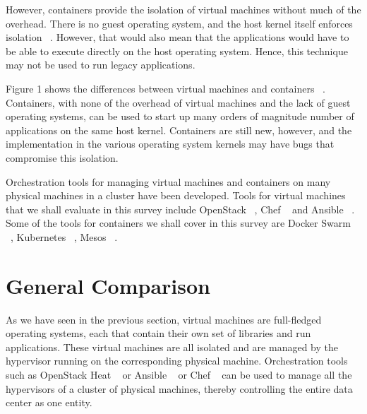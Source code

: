 \documentclass[10pt,twocolumn]{article}
\begin{document}
However, containers provide the isolation of virtual machines without much of the overhead. There is no guest operating system, and the host kernel itself enforces isolation ~\cite{intro_containerisation}.
However, that would also mean that the applications would have to be able to execute directly on the host operating system.
Hence, this technique may not be used to run legacy applications.

Figure 1 shows the differences between virtual machines and containers ~\cite{intro_containerisation}.
Containers, with none of the overhead of virtual machines and the lack of guest operating systems, can be used to start up many orders of magnitude number of applications on the same host kernel.
Containers are still new, however, and the implementation in the various operating system kernels may have bugs that compromise this isolation.

Orchestration tools for managing virtual machines and containers on many physical machines in a cluster have been developed.
Tools for virtual machines that we shall evaluate in this survey include OpenStack ~\cite{openstack}, Chef ~\cite{chef} and Ansible ~\cite{ansible}.
Some of the tools for containers we shall cover in this survey are Docker Swarm ~\cite{docker_swarm}, Kubernetes ~\cite{kubernetes}, Mesos ~\cite{mesos}.

\section{General Comparison}

As we have seen in the previous section, virtual machines are full-fledged operating systems, each that contain their own set of libraries and run applications.
These virtual machines are all isolated and are managed by the hypervisor running on the corresponding physical machine.
Orchestration tools such as OpenStack Heat ~\cite{openstack} or Ansible ~\cite{ansible} or Chef ~\cite{chef} can be used to manage all the hypervisors of a cluster of physical machines, thereby controlling the entire data center as one entity.
\end{document}
